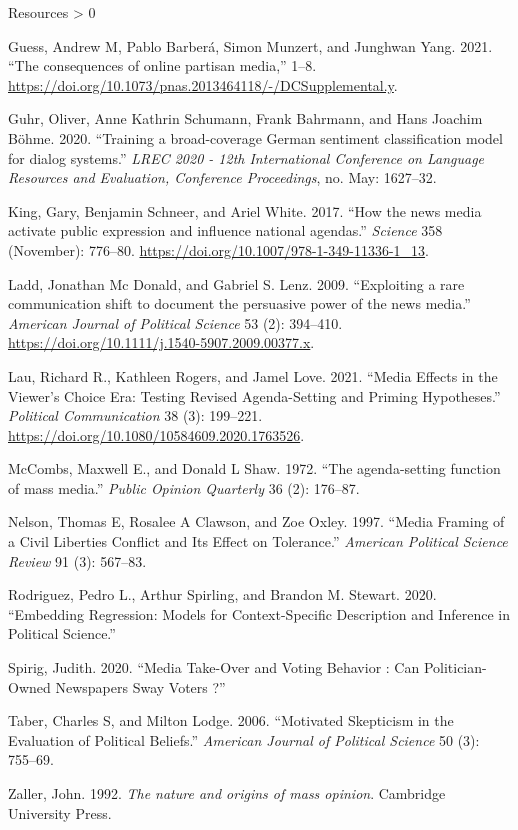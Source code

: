 \documentclass[
  ignorenonframetext,
]{beamer}
\newlength{\cslhangindent}
\newenvironment{CSLReferences}[2] %
 {%
  \setlength{\parindent}{0pt}
  \ifodd #1 \everypar{\setlength{\hangindent}{\cslhangindent}}\ignorespaces\fi
  \ifnum #2 > 0
  \setlength{\parskip}{#2\baselineskip}
  \fi
 }%
 {}
\begin{document}
\begin{frame}[allowframebreaks]{Resources}
\begin{CSLReferences}{1}{0}
\leavevmode\hypertarget{ref-Guess2021}{}%
Guess, Andrew M, Pablo Barberá, Simon Munzert, and Junghwan Yang. 2021.
{``{The consequences of online partisan media},''} 1--8.
\url{https://doi.org/10.1073/pnas.2013464118/-/DCSupplemental.y}.

\leavevmode\hypertarget{ref-Guhr2020}{}%
Guhr, Oliver, Anne Kathrin Schumann, Frank Bahrmann, and Hans Joachim
Böhme. 2020. {``{Training a broad-coverage German sentiment
classification model for dialog systems}.''} \emph{LREC 2020 - 12th
International Conference on Language Resources and Evaluation,
Conference Proceedings}, no. May: 1627--32.

\leavevmode\hypertarget{ref-King2017}{}%
King, Gary, Benjamin Schneer, and Ariel White. 2017. {``{How the news
media activate public expression and influence national agendas}.''}
\emph{Science} 358 (November): 776--80.
\url{https://doi.org/10.1007/978-1-349-11336-1_13}.

\leavevmode\hypertarget{ref-Ladd2009a}{}%
Ladd, Jonathan Mc Donald, and Gabriel S. Lenz. 2009. {``{Exploiting a
rare communication shift to document the persuasive power of the news
media}.''} \emph{American Journal of Political Science} 53 (2):
394--410. \url{https://doi.org/10.1111/j.1540-5907.2009.00377.x}.

\leavevmode\hypertarget{ref-Lau2021}{}%
Lau, Richard R., Kathleen Rogers, and Jamel Love. 2021. {``{Media
Effects in the Viewer's Choice Era: Testing Revised Agenda-Setting and
Priming Hypotheses}.''} \emph{Political Communication} 38 (3): 199--221.
\url{https://doi.org/10.1080/10584609.2020.1763526}.

\leavevmode\hypertarget{ref-McCombs1972}{}%
McCombs, Maxwell E., and Donald L Shaw. 1972. {``{The agenda-setting
function of mass media}.''} \emph{Public Opinion Quarterly} 36 (2):
176--87.

\leavevmode\hypertarget{ref-Nelson1997}{}%
Nelson, Thomas E, Rosalee A Clawson, and Zoe Oxley. 1997. {``{Media
Framing of a Civil Liberties Conflict and Its Effect on Tolerance}.''}
\emph{American Political Science Review} 91 (3): 567--83.

\leavevmode\hypertarget{ref-Rodriguez2020}{}%
Rodriguez, Pedro L., Arthur Spirling, and Brandon M. Stewart. 2020.
{``{Embedding Regression: Models for Context-Specific Description and
Inference in Political Science}.''}

\leavevmode\hypertarget{ref-Spirig2020}{}%
Spirig, Judith. 2020. {``{Media Take-Over and Voting Behavior : Can
Politician-Owned Newspapers Sway Voters ?}''}

\leavevmode\hypertarget{ref-Taber2006}{}%
Taber, Charles S, and Milton Lodge. 2006. {``{Motivated Skepticism in
the Evaluation of Political Beliefs}.''} \emph{American Journal of
Political Science} 50 (3): 755--69.

\leavevmode\hypertarget{ref-Zaller1992}{}%
Zaller, John. 1992. \emph{{The nature and origins of mass opinion}}.
Cambridge University Press.

\end{CSLReferences}
\end{frame}
\end{document}
